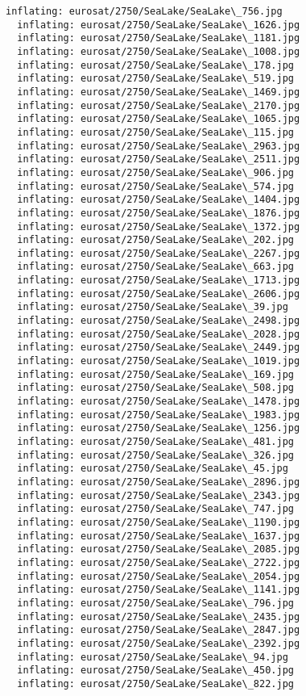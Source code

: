 \documentclass[11pt]{article}
\begin{document}
\begin{Verbatim}[commandchars=\\\{\}]
  inflating: eurosat/2750/SeaLake/SeaLake\_756.jpg
  inflating: eurosat/2750/SeaLake/SeaLake\_1626.jpg
  inflating: eurosat/2750/SeaLake/SeaLake\_1181.jpg
  inflating: eurosat/2750/SeaLake/SeaLake\_1008.jpg
  inflating: eurosat/2750/SeaLake/SeaLake\_178.jpg
  inflating: eurosat/2750/SeaLake/SeaLake\_519.jpg
  inflating: eurosat/2750/SeaLake/SeaLake\_1469.jpg
  inflating: eurosat/2750/SeaLake/SeaLake\_2170.jpg
  inflating: eurosat/2750/SeaLake/SeaLake\_1065.jpg
  inflating: eurosat/2750/SeaLake/SeaLake\_115.jpg
  inflating: eurosat/2750/SeaLake/SeaLake\_2963.jpg
  inflating: eurosat/2750/SeaLake/SeaLake\_2511.jpg
  inflating: eurosat/2750/SeaLake/SeaLake\_906.jpg
  inflating: eurosat/2750/SeaLake/SeaLake\_574.jpg
  inflating: eurosat/2750/SeaLake/SeaLake\_1404.jpg
  inflating: eurosat/2750/SeaLake/SeaLake\_1876.jpg
  inflating: eurosat/2750/SeaLake/SeaLake\_1372.jpg
  inflating: eurosat/2750/SeaLake/SeaLake\_202.jpg
  inflating: eurosat/2750/SeaLake/SeaLake\_2267.jpg
  inflating: eurosat/2750/SeaLake/SeaLake\_663.jpg
  inflating: eurosat/2750/SeaLake/SeaLake\_1713.jpg
  inflating: eurosat/2750/SeaLake/SeaLake\_2606.jpg
  inflating: eurosat/2750/SeaLake/SeaLake\_39.jpg
  inflating: eurosat/2750/SeaLake/SeaLake\_2498.jpg
  inflating: eurosat/2750/SeaLake/SeaLake\_2028.jpg
  inflating: eurosat/2750/SeaLake/SeaLake\_2449.jpg
  inflating: eurosat/2750/SeaLake/SeaLake\_1019.jpg
  inflating: eurosat/2750/SeaLake/SeaLake\_169.jpg
  inflating: eurosat/2750/SeaLake/SeaLake\_508.jpg
  inflating: eurosat/2750/SeaLake/SeaLake\_1478.jpg
  inflating: eurosat/2750/SeaLake/SeaLake\_1983.jpg
  inflating: eurosat/2750/SeaLake/SeaLake\_1256.jpg
  inflating: eurosat/2750/SeaLake/SeaLake\_481.jpg
  inflating: eurosat/2750/SeaLake/SeaLake\_326.jpg
  inflating: eurosat/2750/SeaLake/SeaLake\_45.jpg
  inflating: eurosat/2750/SeaLake/SeaLake\_2896.jpg
  inflating: eurosat/2750/SeaLake/SeaLake\_2343.jpg
  inflating: eurosat/2750/SeaLake/SeaLake\_747.jpg
  inflating: eurosat/2750/SeaLake/SeaLake\_1190.jpg
  inflating: eurosat/2750/SeaLake/SeaLake\_1637.jpg
  inflating: eurosat/2750/SeaLake/SeaLake\_2085.jpg
  inflating: eurosat/2750/SeaLake/SeaLake\_2722.jpg
  inflating: eurosat/2750/SeaLake/SeaLake\_2054.jpg
  inflating: eurosat/2750/SeaLake/SeaLake\_1141.jpg
  inflating: eurosat/2750/SeaLake/SeaLake\_796.jpg
  inflating: eurosat/2750/SeaLake/SeaLake\_2435.jpg
  inflating: eurosat/2750/SeaLake/SeaLake\_2847.jpg
  inflating: eurosat/2750/SeaLake/SeaLake\_2392.jpg
  inflating: eurosat/2750/SeaLake/SeaLake\_94.jpg
  inflating: eurosat/2750/SeaLake/SeaLake\_450.jpg
  inflating: eurosat/2750/SeaLake/SeaLake\_822.jpg

\end{Verbatim}
\end{document}
